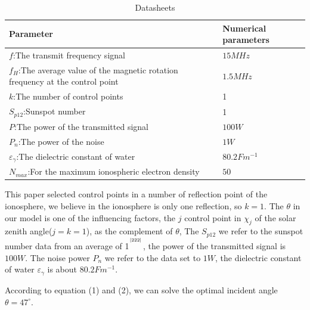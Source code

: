 \documentclass{mcmthesis}
\newcommand{\upcite}[1]%
{\textsuperscript{\textsuperscript{\cite{#1}}}}
\begin{document}
\begin{table}[!ht]

 \renewcommand\arraystretch{1.5}
 \setlength{\abovecaptionskip}{0pt}%
\setlength{\belowcaptionskip}{10pt}%
\begin{center}
\begin{tabular}{p{}p{}}
\toprule[2pt]
Parameter& Numerical parameters \\
 \midrule

$f$:The transmit frequency signal & $15MHz$ \\

$f_H$:The average value of the magnetic rotation frequency at the control point & $1.5MHz$  \\

$k$:The number of control points & 1  \\

$S_{p12}$:Sunspot number & 1  \\

$P$:The power of the transmitted signal & $100W$  \\

$P_n$:The power of the noise & $1W$  \\

${\varepsilon _\gamma }$:The dielectric constant of water & $80.2Fm^{-1}$  \\

$N_{max}$:For the maximum ionospheric electron density & $50$  \\

 \bottomrule[2pt]
 \end{tabular}
 \end{center} 
 \caption{Datasheets}
 \end{table}
This paper selected control points in a number of reflection point of the ionosphere, we believe in the ionosphere is only one reflection, so $k=1$. The $\theta$ in our model is one of the influencing factors, the $j$ control point in ${\chi _j}$ of the solar zenith angle($j=k=1$), as the complement of $\theta$, The $S_{p12}$ we refer to the sunspot number data from an average of 1$^{\upcite{222}}$, the power of the transmitted signal is $100W$. The noise power $P_n$ we refer to the data set to $1W$, the dielectric constant of water ${\varepsilon _\gamma }$ is about $80.2F{m^{ - 1}}$.

According to equation (1) and (2), we can solve the optimal incident angle $\theta  = {47^ \circ }$.
\end{document}
